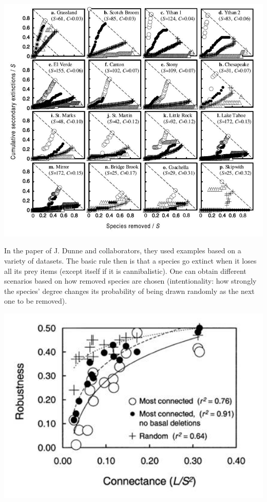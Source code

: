 \documentclass[
]{book}
\theoremstyle{definition}
\theoremstyle{definition}
\theoremstyle{definition}
\theoremstyle{definition}
\theoremstyle{remark}
\begin{document}
\includegraphics[width=11.92in]{fig06Networks/Dunne1}

In the paper of J. Dunne and collaborators, they used examples based on a variety of datasets. The basic rule then is that a species go extinct when it loses all its prey items (except itself if it is cannibalistic).
One can obtain different scenarios based on how removed species are chosen (intentionality: how strongly the species' degree changes its probability of being drawn randomly as the next one to be removed).

\includegraphics[width=5.97in]{fig06Networks/Dunne2}
\end{document}
